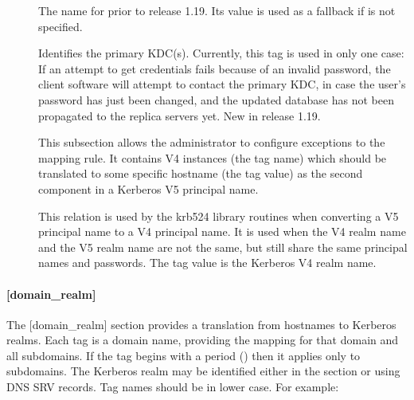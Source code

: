 \documentclass[letterpaper,10pt,english]{sphinxmanual}
\begin{document}
\begin{description}
\item[{}] \leavevmode
\sphinxAtStartPar
The name for  prior to release 1.19.  Its value is
used as a fallback if  is not specified.

\item[{}] \leavevmode
\sphinxAtStartPar
Identifies the primary KDC(s).  Currently, this tag is used in only
one case: If an attempt to get credentials fails because of an
invalid password, the client software will attempt to contact the
primary KDC, in case the user’s password has just been changed, and
the updated database has not been propagated to the replica
servers yet.  New in release 1.19.

\item[{}] \leavevmode
\sphinxAtStartPar
This subsection allows the administrator to configure exceptions
to the  mapping rule.  It contains V4 instances
(the tag name) which should be translated to some specific
hostname (the tag value) as the second component in a Kerberos V5
principal name.

\item[{}] \leavevmode
\sphinxAtStartPar
This relation is used by the krb524 library routines when
converting a V5 principal name to a V4 principal name.  It is used
when the V4 realm name and the V5 realm name are not the same, but
still share the same principal names and passwords. The tag value
is the Kerberos V4 realm name.

\end{description}


\paragraph{{[}domain\_realm{]}}
\label{\detokenize{admin/conf_files/krb5_conf:domain-realm}}\label{\detokenize{admin/conf_files/krb5_conf:id3}}
\sphinxAtStartPar
The {[}domain\_realm{]} section provides a translation from hostnames to
Kerberos realms.  Each tag is a domain name, providing the mapping for
that domain and all subdomains.  If the tag begins with a period
() then it applies only to subdomains.  The Kerberos realm may be
identified either in the {\hyperref[\detokenize{admin/conf_files/krb5_conf:realms}]{}} section or using DNS SRV records.
Tag names should be in lower case.  For example:
\end{document}
